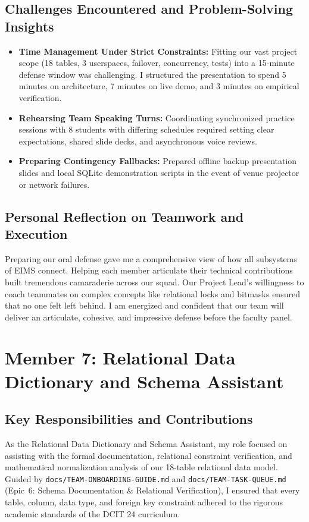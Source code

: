 \subsection{Challenges Encountered and Problem-Solving Insights}
\begin{itemize}
    \item \textbf{Time Management Under Strict Constraints:} Fitting our vast project scope (18 tables, 3 userspaces, failover, concurrency, tests) into a 15-minute defense window was challenging. I structured the presentation to spend 5 minutes on architecture, 7 minutes on live demo, and 3 minutes on empirical verification.
    \item \textbf{Rehearsing Team Speaking Turns:} Coordinating synchronized practice sessions with 8 students with differing schedules required setting clear expectations, shared slide decks, and asynchronous voice reviews.
    \item \textbf{Preparing Contingency Fallbacks:} Prepared offline backup presentation slides and local SQLite demonstration scripts in the event of venue projector or network failures.
\end{itemize}

\subsection{Personal Reflection on Teamwork and Execution}
Preparing our oral defense gave me a comprehensive view of how all subsystems of EIMS connect. Helping each member articulate their technical contributions built tremendous camaraderie across our squad. Our Project Lead's willingness to coach teammates on complex concepts like relational locks and bitmasks ensured that no one felt left behind. I am energized and confident that our team will deliver an articulate, cohesive, and impressive defense before the faculty panel.

\newpage
\section{Member 7: Relational Data Dictionary and Schema Assistant}
\label{sec:reflection_member_7}

\subsection{Key Responsibilities and Contributions}
As the Relational Data Dictionary and Schema Assistant, my role focused on assisting with the formal documentation, relational constraint verification, and mathematical normalization analysis of our 18-table relational data model. Guided by \texttt{docs/TEAM-ONBOARDING-GUIDE.md} and \texttt{docs/TEAM-TASK-QUEUE.md} (Epic~6: Schema Documentation \& Relational Verification), I ensured that every table, column, data type, and foreign key constraint adhered to the rigorous academic standards of the DCIT 24 curriculum.

